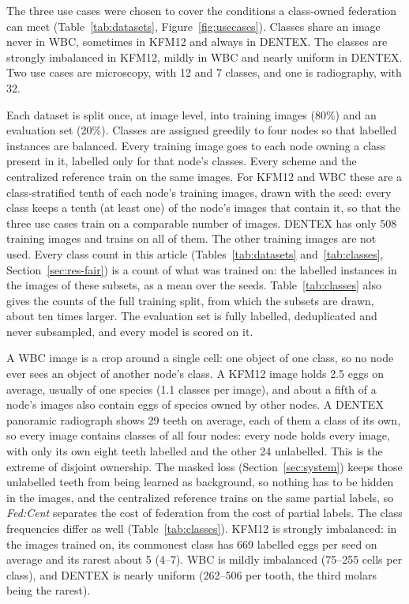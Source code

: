 \documentclass[pdflatex,sn-mathphys-num]{sn-jnl}
\newcommand{\fedcent}{\textit{Fed:Cent}}
\begin{document}
The three use cases were chosen to cover the conditions a class-owned federation can meet (Table~\ref{tab:datasets}, Figure~\ref{fig:usecases}). Classes share an image never in WBC, sometimes in KFM12 and always in DENTEX. The classes are strongly imbalanced in KFM12, mildly in WBC and nearly uniform in DENTEX. Two use cases are microscopy, with 12 and 7 classes, and one is radiography, with 32.

Each dataset is split once, at image level, into training images (80\%) and an evaluation set (20\%). Classes are assigned greedily to four nodes so that labelled instances are balanced. Every training image goes to each node owning a class present in it, labelled only for that node's classes. Every scheme and the centralized reference train on the same images. For KFM12 and WBC these are a class-stratified tenth of each node's training images, drawn with the seed: every class keeps a tenth (at least one) of the node's images that contain it, so that the three use cases train on a comparable number of images. DENTEX has only 508 training images and trains on all of them. The other training images are not used. Every class count in this article (Tables~\ref{tab:datasets} and~\ref{tab:classes}, Section~\ref{sec:res-fair}) is a count of what was trained on: the labelled instances in the images of these subsets, as a mean over the seeds. Table~\ref{tab:classes} also gives the counts of the full training split, from which the subsets are drawn, about ten times larger. The evaluation set is fully labelled, deduplicated and never subsampled, and every model is scored on it.

A WBC image is a crop around a single cell: one object of one class, so no node ever sees an object of another node's class. A KFM12 image holds 2.5 eggs on average, usually of one species (1.1 classes per image), and about a fifth of a node's images also contain eggs of species owned by other nodes. A DENTEX panoramic radiograph shows 29 teeth on average, each of them a class of its own, so every image contains classes of all four nodes: every node holds every image, with only its own eight teeth labelled and the other 24 unlabelled. This is the extreme of disjoint ownership. The masked loss (Section~\ref{sec:system}) keeps those unlabelled teeth from being learned as background, so nothing has to be hidden in the images, and the centralized reference trains on the same partial labels, so \fedcent{} separates the cost of federation from the cost of partial labels. The class frequencies differ as well (Table~\ref{tab:classes}). KFM12 is strongly imbalanced: in the images trained on, its commonest class has 669 labelled eggs per seed on average and its rarest about 5 (4--7). WBC is mildly imbalanced (75--255 cells per class), and DENTEX is nearly uniform (262--506 per tooth, the third molars being the rarest).
\end{document}
